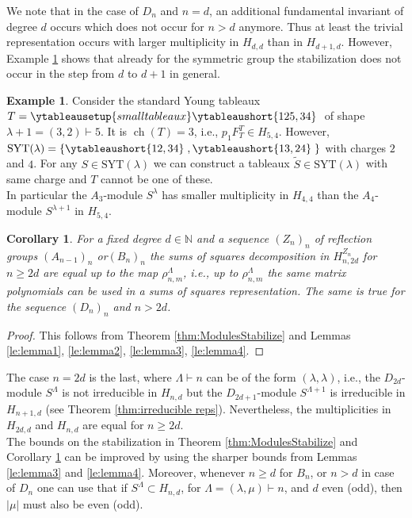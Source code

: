\documentclass[11pt,a4paper]{amsart}
\numberwithin{equation}{section}
\newtheorem{cor}[thm]{Corollary}
\theoremstyle{definition}
\newtheorem{example}[thm]{Example}
\newcommand{\N}{\mathbb{N}}
\DeclareMathOperator{\ch}{ch}
\numberwithin{thm}{section}
\theoremstyle{break}
\numberwithin{subcase}{case}
\begin{document}
We note that in the case of $D_n$ and $n=d$, an additional fundamental invariant of degree $d$ occurs which does not occur for $n > d$ anymore. Thus at least the trivial representation occurs with larger multiplicity in $H_{d,d}$ than in $H_{d+1,d}$. However, Example \ref{ex: d->d+1} shows that already for the symmetric group the stabilization does not occur in the step from $d$ to $d+1$ in general. 
\begin{example} \label{ex: d->d+1}
Consider the standard Young tableaux $T= \ytableausetup{smalltableaux}
  \ytableaushort{
   125,34}\; $
  of shape $\lambda+1 = (3,2) \vdash 5$. It is $\ch (T) = 3$, i.e., $p_1 F^T_T \in H_{5,4}$. However, $\text{SYT}(\lambda) = \left\{  \ytableaushort{
   12,34}\; 
  ,  \ytableaushort{
   13,24}\;
  \right\}$ with charges $2$ and $4$. For any $S \in \text{SYT}(\lambda)$ we can construct a tableaux $\widetilde{S} \in \text{SYT}(\lambda)$ with same charge and $T$ cannot be one of these. \\
  In particular the $A_3$-module $S^{\lambda}$ has smaller multiplicity in $H_{4,4}$ than the $A_4$-module $S^{\lambda +1}$ in $H_{5,4}$.
\end{example}

\begin{cor} \label{cor:ModulesStabilize}
For a fixed degree $d \in \N$ and a sequence $(Z_n)_n$ of reflection groups 
$(A_{n-1})_n$ or$ (B_n)_n$ the sums of squares decomposition in $H_{n,2d}^{Z_n}$ for $n \geq 2d$ are equal up to the map $\rho_{n,m}^\Lambda$, i.e., up to $\rho_{n,m}^\Lambda$ the same matrix polynomials can be used in a sums of squares representation. The same is true for the sequence $(D_n)_n$ and $n > 2d$.
\end{cor}
\begin{proof}
This follows from Theorem \ref{thm:ModulesStabilize} and Lemmas \ref{le:lemma1}, \ref{le:lemma2}, \ref{le:lemma3}, \ref{le:lemma4}.
\end{proof}

The case $n=2d$ is the last, where $\Lambda \vdash n$ can be of the form $(\lambda, \lambda)$, i.e., the $D_{2d}$-module $S^{\Lambda}$ is not irreducible in $H_{n,d}$ but the $D_{2d+1}$-module $S^{\Lambda+1}$ is irreducible in $H_{n+1,d}$ (see Theorem \ref{thm:irreducible reps}). Nevertheless, the multiplicities in $H_{2d,d}$ and $H_{n,d}$ are equal for $n \geq 2d$.  \\
The bounds on the stabilization in Theorem \ref{thm:ModulesStabilize} and Corollary \ref{cor:ModulesStabilize} can be improved by using the sharper bounds from Lemmas \ref{le:lemma3} and \ref{le:lemma4}. Moreover, whenever $n \geq d$ for $B_n$, or $n > d$ in case of $D_n$ one can use that if $S^{\Lambda}\subset H_{n,d}$, for $\Lambda = (\lambda, \mu) \vdash n$, and $d$ even (odd), then $|\mu|$ must also be even (odd).
\end{document}
